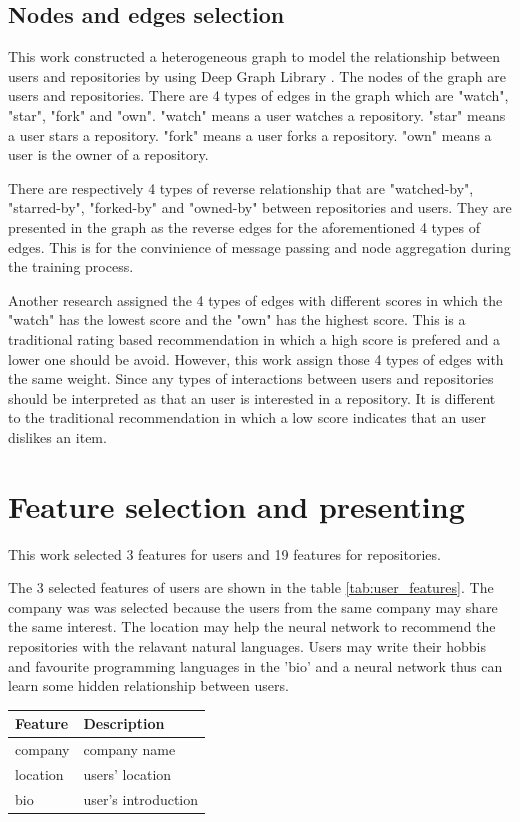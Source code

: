\documentclass[11pt,twoside]{report}
\begin{document}
\subsection{Nodes and edges selection}
This work constructed a heterogeneous graph to model the relationship between users and repositories by using Deep Graph Library \cite{wang2019dgl}. The nodes of the graph are users and repositories. There are 4 types of edges in the graph which are "watch", "star", "fork" and "own". "watch" means a user watches a repository. "star" means a user stars a repository. "fork" means a user forks a repository. "own" means a user is the owner of a repository. 

There are respectively 4 types of reverse relationship that are "watched-by", "starred-by", "forked-by" and "owned-by" between repositories and users. They are presented in the graph as the reverse edges for the aforementioned 4 types of edges. This is for the convinience of message passing and node aggregation during the training process.

Another research \cite{sun_personalized_2018} assigned the 4 types of edges with different scores in which the "watch" has the lowest score and the "own" has the highest score. This is a traditional rating based recommendation in which a high score is prefered and a lower one should be avoid. However, this work assign those 4 types of edges with the same weight. Since any types of interactions between users and repositories should be interpreted as that an user is interested in a repository. It is different to the traditional recommendation in which a low score indicates that an user dislikes an item.

\section{Feature selection and presenting}
This work selected 3 features for users and 19 features for repositories. 

The 3 selected features of users are shown in the table \ref{tab:user_features}. The company was was selected because the users from the same company may share the same interest. The location may help the neural network to recommend the repositories with the relavant natural languages. Users may write their hobbis and favourite programming languages in the 'bio' and a neural network thus can learn some hidden relationship between users.

\begin{center}
    \begin{tabular}{| l | l |}
    \hline
    Feature & Description \\ \hline
    company & company name \\ \hline
    location & users' location \\ \hline
    bio & user's introduction \\ \hline
    \end{tabular}
    \label{tab:user_features}
\end{center}
\end{document}
